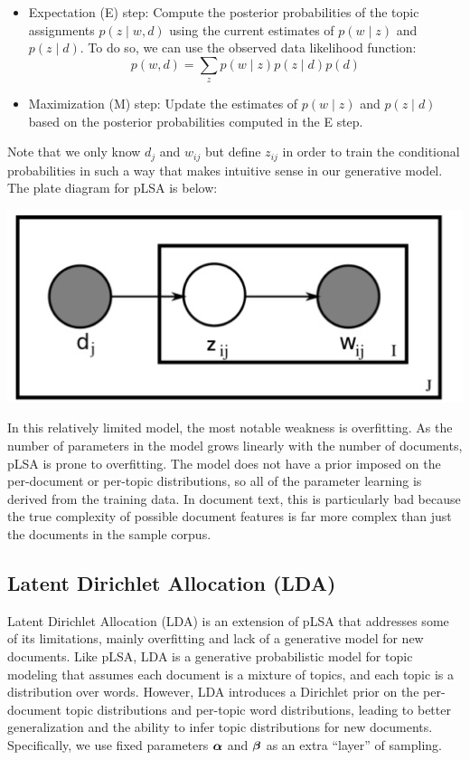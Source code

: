 \documentclass[12pt,letterpaper]{article}
\begin{document}
\begin{itemize}
    \item Expectation (E) step: Compute the posterior probabilities of the topic assignments $p(z \mid w, d)$ using the current estimates of $p(w \mid z)$ and $p(z \mid d)$. To do so, we can use the observed data likelihood function: $$p(w, d) = \sum_z p(w \mid z)p(z \mid d)p(d)$$
    \item Maximization (M) step: Update the estimates of $p(w \mid z)$ and $p(z \mid d)$ based on the posterior probabilities computed in the E step.
\end{itemize}
Note that we only know $d_j$ and $w_{ij}$ but define $z_{ij}$ in order to train the conditional probabilities in such a way that makes intuitive sense in our generative model. The plate diagram for pLSA is below:

\begin{center}
    \includegraphics[scale=0.5]{pLSA.png}
\end{center}

In this relatively limited model, the most notable weakness is overfitting. As the number of parameters in the model grows linearly with the number of documents, pLSA is prone to overfitting. The model does not have a prior imposed on the per-document or per-topic distributions, so all of the parameter learning is derived from the training data. In document text, this is particularly bad because the true complexity of possible document features is far more complex than just the documents in the sample corpus.

\subsection{Latent Dirichlet Allocation (LDA)}

Latent Dirichlet Allocation (LDA) is an extension of pLSA that addresses some of its limitations, mainly overfitting and lack of a generative model for new documents. Like pLSA, LDA is a generative probabilistic model for topic modeling that assumes each document is a mixture of topics, and each topic is a distribution over words. However, LDA introduces a Dirichlet prior on the per-document topic distributions and per-topic word distributions, leading to better generalization and the ability to infer topic distributions for new documents. Specifically, we use fixed parameters $\boldsymbol{\alpha}$ and $\boldsymbol{\beta}$ as an extra ``layer'' of sampling. 
\end{document}
